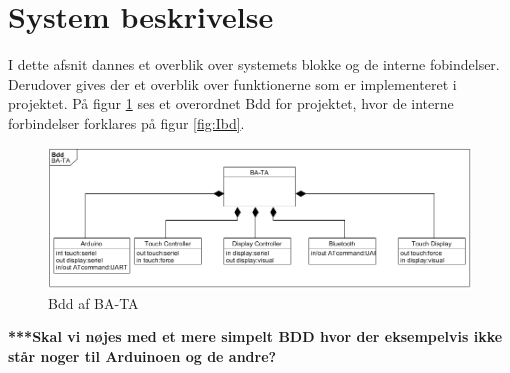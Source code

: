 \graphicspath{{Chapters/System/}}


\section{System beskrivelse}
I dette afsnit dannes et overblik over systemets blokke og de interne fobindelser. Derudover gives der et overblik over funktionerne som er implementeret i projektet. 
På figur \ref{fig:Bdd} ses et overordnet Bdd for projektet, hvor de interne forbindelser forklares på figur \ref{fig:Ibd}. 

\begin{figure}[H]
	\centering
	\includegraphics[width = 500 pt]{Img/Bdd.png}
	\caption{Bdd af BA-TA}
	\label{fig:Bdd}
\end{figure}

\textbf{***Skal vi nøjes med et mere simpelt BDD hvor der eksempelvis ikke står noger til Arduinoen og de andre?}


